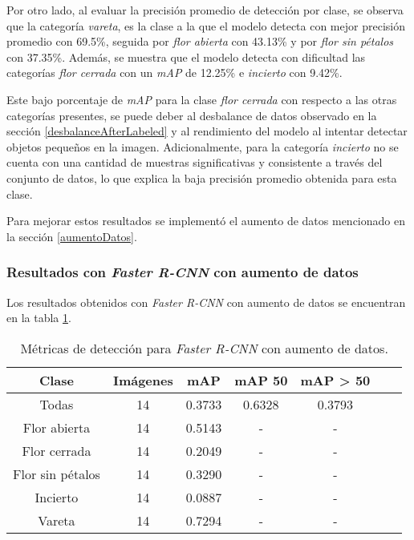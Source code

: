 Por otro lado, al evaluar la precisión promedio de detección por clase, se observa que la categoría \textit{vareta}, es la clase a la que el modelo detecta con mejor precisión promedio con 69.5\%, seguida por \textit{flor abierta} con 43.13\% y por \textit{flor sin pétalos} con 37.35\%. Además, se muestra que el modelo detecta con dificultad las categorías \textit{flor cerrada} con un \textit{mAP} de 12.25\% e \textit{incierto} con 9.42\%.

Este bajo porcentaje de \textit{mAP} para la clase \textit{flor cerrada} con respecto a las otras categorías presentes, se puede deber al desbalance de datos observado en la sección \ref{desbalanceAfterLabeled} y al rendimiento del modelo al intentar detectar objetos pequeños en la imagen. Adicionalmente, para la categoría \textit{incierto} no se cuenta con una cantidad de muestras significativas y consistente a través del conjunto de datos, lo que explica la baja precisión promedio obtenida para esta clase.

Para mejorar estos resultados se implementó el aumento de datos mencionado en la sección \ref{aumentoDatos}.

\subsubsection{Resultados con \textit{Faster R-CNN} con aumento de datos}

Los resultados obtenidos con \textit{Faster R-CNN} con aumento de datos se encuentran en la tabla \ref{tab:resultadosFasterConAug}. 

\begin{table}[h]
	\centering
	\caption{Métricas de detección para \textit{Faster R-CNN} con aumento de datos.}
	\begin{tabular}{c c c c c c c}    
		\toprule
		\textbf{Clase}&\textbf{Imágenes}&\textbf{mAP}&\textbf{mAP 50}&\textbf{mAP > 50}\\
		\midrule
		Todas & 14 & 0.3733 & 0.6328 & 0.3793\\
		Flor abierta & 14 & 0.5143 & - & - \\
		Flor cerrada & 14 & 0.2049 & - & - \\
		Flor sin pétalos & 14 & 0.3290 & - & - \\
		Incierto & 14 & 0.0887 & - & - \\
		Vareta & 14 & 0.7294 & - & - \\		
		\bottomrule
		\hline
	\end{tabular}
	\label{tab:resultadosFasterConAug}
\end{table}

